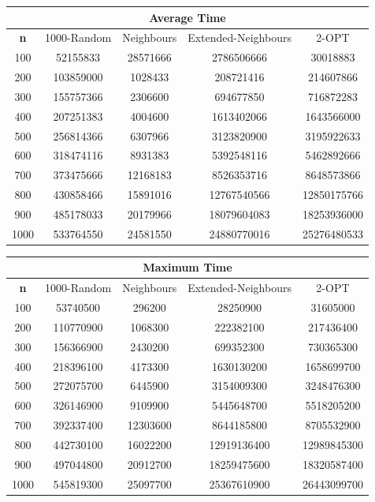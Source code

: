\documentclass{article}
\begin{document}
\begin{center}
\begin{tabular}{|c|c|c|c|c|}
\hline
\multicolumn{5}{|c|}{\textbf{Average Time}}\\
\hline
\textbf{n} & 1000-Random & Neighbours & Extended-Neighbours & 2-OPT\\
\hline
100 & 52155833 & 28571666 & 2786506666 & 30018883\\
\hline
200 & 103859000 & 1028433 & 208721416 & 214607866\\
\hline
300 & 155757366 & 2306600 & 694677850 & 716872283\\
\hline
400 & 207251383 & 4004600 & 1613402066 & 1643566000\\
\hline
500 & 256814366 & 6307966 & 3123820900 & 3195922633\\
\hline
600 & 318474116 & 8931383 & 5392548116 & 5462892666\\
\hline
700 & 373475666 & 12168183 & 8526353716 & 8648573866\\
\hline
800 & 430858466 & 15891016 & 12767540566 & 12850175766\\
\hline
900 & 485178033 & 20179966 & 18079604083 & 18253936000\\
\hline
1000 & 533764550 & 24581550 & 24880770016 & 25276480533\\
\hline
\end{tabular}
\end{center}

\begin{center}
\begin{tabular}{|c|c|c|c|c|}
\hline
\multicolumn{5}{|c|}{\textbf{Maximum Time}}\\
\hline
\textbf{n} & 1000-Random & Neighbours & Extended-Neighbours & 2-OPT\\
\hline
100 & 53740500 & 296200 & 28250900 & 31605000\\
\hline
200 & 110770900 & 1068300 & 222382100 & 217436400\\
\hline
300 & 156366900 & 2430200 & 699352300 & 730365300\\
\hline
400 & 218396100 & 4173300 & 1630130200 & 1658699700\\
\hline
500 & 272075700 & 6445900 & 3154009300 & 3248476300\\
\hline
600 & 326146900 & 9109900 & 5445648700 & 5518205200\\
\hline
700 & 392337400 & 12303600 & 8644185800 & 8705532900\\
\hline
800 & 442730100 & 16022200 & 12919136400 & 12989845300\\
\hline
900 & 497044800 & 20912700 & 18259475600 & 18320587400\\
\hline
1000 & 545819300 & 25097700 & 25367610900 & 26443099700\\
\hline
\end{tabular}
\end{center}
\end{document}
